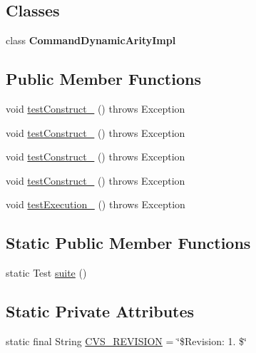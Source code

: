 \subsection*{Classes}
\begin{DoxyCompactItemize}
\item 
class {\bfseries Command\-Dynamic\-Arity\-Impl}
\end{DoxyCompactItemize}
\subsection*{Public Member Functions}
\begin{DoxyCompactItemize}
\item 
void \hyperlink{classorg_1_1jgap_1_1gp_1_1_command_dynamic_arity_test_a55c5c21ff125d079a04daeeadd135fdb}{test\-Construct\-\_} ()  throws Exception 
\item 
void \hyperlink{classorg_1_1jgap_1_1gp_1_1_command_dynamic_arity_test_ad691e267abfbc8f39d19ec932f40b9f7}{test\-Construct\-\_} ()  throws Exception 
\item 
void \hyperlink{classorg_1_1jgap_1_1gp_1_1_command_dynamic_arity_test_a0c6759cfb6f541af1f771879c90a7f28}{test\-Construct\-\_} ()  throws Exception 
\item 
void \hyperlink{classorg_1_1jgap_1_1gp_1_1_command_dynamic_arity_test_a79b3f13985cdcb966f03b15afe6e9cd2}{test\-Construct\-\_} ()  throws Exception 
\item 
void \hyperlink{classorg_1_1jgap_1_1gp_1_1_command_dynamic_arity_test_a1198e1ca8ce61a36717f6b84b08ebac2}{test\-Execution\-\_} ()  throws Exception 
\end{DoxyCompactItemize}
\subsection*{Static Public Member Functions}
\begin{DoxyCompactItemize}
\item 
static Test \hyperlink{classorg_1_1jgap_1_1gp_1_1_command_dynamic_arity_test_aecdf2c57e029c1fa3c8cc68da45570b0}{suite} ()
\end{DoxyCompactItemize}
\subsection*{Static Private Attributes}
\begin{DoxyCompactItemize}
\item 
static final String \hyperlink{classorg_1_1jgap_1_1gp_1_1_command_dynamic_arity_test_a89ac117fa956c7a608c04d2f74db30b2}{C\-V\-S\-\_\-\-R\-E\-V\-I\-S\-I\-O\-N} = \char`\"{}\$Revision\-: 1. \$\char`\"{}
\end{DoxyCompactItemize}
